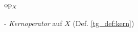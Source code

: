     \paragraph{$\text{op}_X$} - \quad \textit{Kernoperator} auf $X$ (Def. \ref{tg_def:kern})




% 
%         
%         
%         
%         
%         
%     
% 
%         
%         
%         
% 
% 
% 
% 
%         



